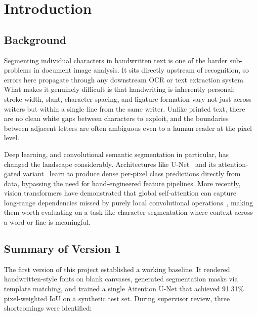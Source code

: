 \documentclass[a4paper,11pt]{article}
\begin{document}
\section{Introduction}
\label{sec:introduction}

\subsection{Background}

Segmenting individual characters in handwritten text is one of the harder sub-problems
in document image analysis. It sits directly upstream of recognition, so errors here
propagate through any downstream OCR or text extraction system. What makes it genuinely
difficult is that handwriting is inherently personal: stroke width, slant, character
spacing, and ligature formation vary not just across writers but within a single line from
the same writer. Unlike printed text, there are no clean white gaps between characters to
exploit, and the boundaries between adjacent letters are often ambiguous even to a human
reader at the pixel level.

Deep learning, and convolutional semantic segmentation in particular, has changed the
landscape considerably. Architectures like U-Net~\cite{ronneberger2015} and its
attention-gated variant~\cite{oktay2018} learn to produce dense per-pixel class
predictions directly from data, bypassing the need for hand-engineered feature pipelines.
More recently, vision transformers have demonstrated that global self-attention can
capture long-range dependencies missed by purely local convolutional
operations~\cite{liu2021,cao2022}, making them worth evaluating on a task like character
segmentation where context across a word or line is meaningful.

\subsection{Summary of Version 1}

The first version of this project established a working baseline. It rendered
handwritten-style fonts on blank canvases, generated segmentation masks via template
matching, and trained a single Attention U-Net that achieved 91.31\% pixel-weighted IoU
on a synthetic test set. During supervisor review, three shortcomings were identified:
\end{document}
